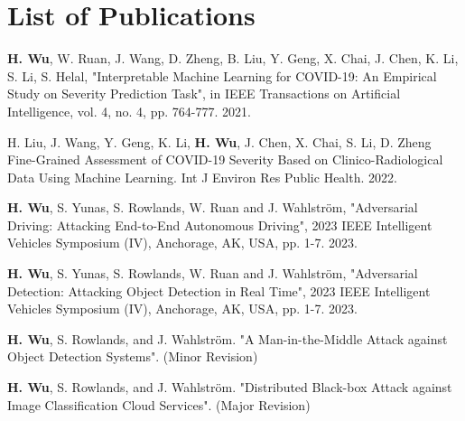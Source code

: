 \chapter*{List of Publications}

\noindent \textbf{H. Wu}, W. Ruan, J. Wang, D. Zheng, B. Liu, Y. Geng, X. Chai, J. Chen, K. Li, S. Li, S. Helal, "Interpretable Machine Learning for COVID-19: An Empirical Study on Severity Prediction Task", in IEEE Transactions on Artificial Intelligence, vol. 4, no. 4, pp. 764-777. 2021.

\vspace{4pt}

\noindent
H. Liu, J. Wang, Y. Geng, K. Li, \textbf{H. Wu}, J. Chen, X. Chai, S. Li, D. Zheng Fine-Grained Assessment of COVID-19 Severity Based on Clinico-Radiological Data Using Machine Learning. Int J Environ Res Public Health. 2022.

\vspace{4pt}

\noindent
\textbf{H. Wu}, S. Yunas, S. Rowlands, W. Ruan and J. Wahlström, "Adversarial Driving: Attacking End-to-End Autonomous Driving", 2023 IEEE Intelligent Vehicles Symposium (IV), Anchorage, AK, USA, pp. 1-7. 2023.

\vspace{4pt}

\noindent
\textbf{H. Wu}, S. Yunas, S. Rowlands, W. Ruan and J. Wahlström, "Adversarial Detection: Attacking Object Detection in Real Time", 2023 IEEE Intelligent Vehicles Symposium (IV), Anchorage, AK, USA, pp. 1-7. 2023.

\vspace{4pt}

\noindent
\textbf{H. Wu}, S. Rowlands, and J. Wahlström. "A Man-in-the-Middle Attack against Object Detection Systems". (Minor Revision)

\vspace{4pt}

\noindent
\textbf{H. Wu}, S. Rowlands, and J. Wahlström. "Distributed Black-box Attack against Image Classification Cloud Services". (Major Revision)


